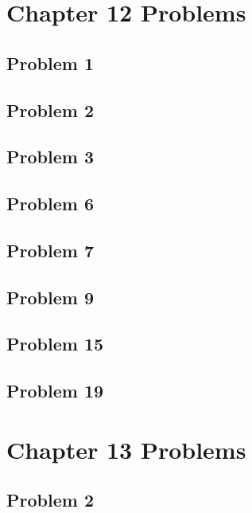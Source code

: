 \documentclass[10pt]{mypackage}
\begin{document}
\section{Chapter 12 Problems}%
\subsection{Problem 1}%
\subsection{Problem 2}%
\subsection{Problem 3}%
\subsection{Problem 6}%
\subsection{Problem 7}%
\subsection{Problem 9}%
\subsection{Problem 15}%
\subsection{Problem 19}%

\section{Chapter 13 Problems}%
\subsection{Problem 2}%
\end{document}
